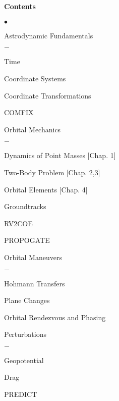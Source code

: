 \documentclass[10pt]{article}
\begin{document}
\paragraph*{Contents}
\begin{list}{$\bullet$}{\setlength{\itemsep}{-3pt}}
\item Astrodynamic Fundamentals
    \begin{list}{$-$}{\setlength{\itemsep}{-3pt}}
    \item Time
    \item Coordinate Systems
    \item Coordinate Transformations
    \item COMFIX
    \end{list}
\item Orbital Mechanics\vspace*{-0.2cm}
    \begin{list}{$-$}{\setlength{\itemsep}{-3pt}}
    \item Dynamics of Point Masses [Chap. 1]
    \item Two-Body Problem [Chap. 2,3]
    \item Orbital Elements [Chap. 4]
    \item Groundtracks
    \item RV2COE
    \item PROPOGATE
    \end{list}
\item Orbital Maneuvers\vspace*{-0.2cm}
    \begin{list}{$-$}{\setlength{\itemsep}{-3pt}}
    \item Hohmann Transfers
    \item Plane Changes
    \item Orbital Rendezvous and Phasing
    \end{list}
\item Perturbations
    \begin{list}{$-$}{\setlength{\itemsep}{-3pt}}
    \item Geopotential
    \item Drag
    \item PREDICT
    \end{list}
\end{list}
\end{document}

